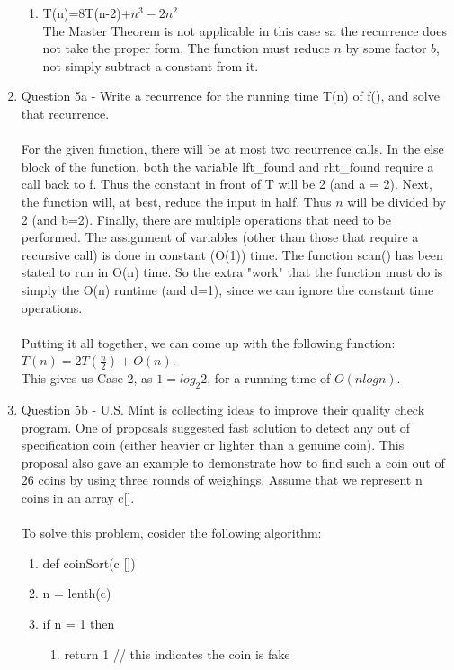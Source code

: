 \documentclass{article}
\begin{document}
\begin{enumerate}
\begin{enumerate}
        \item T(n)=8T(n-2)+\(n^3-2n^2\)\\
        The Master Theorem is not applicable in this case sa the recurrence does not take the proper form.
        The function must reduce $n$ by some factor $b$, not simply subtract a constant from it.\\

    \end{enumerate}
  \item Question 5a - Write a recurrence for the running time T(n) of f(), and solve that recurrence.\\\\
    For the given function, there will be at most two recurrence calls. In the else block of the function, 
    both the variable lft\_found and rht\_found require a call back to f. Thus the constant in front of T will be 2 (and
    a = 2). Next, the function will, at best, reduce the input in half. Thus $n$ will be divided by 2 (and b=2).
    Finally, there are multiple operations that need to be performed. The assignment of variables (other than those that
    require a recursive call) is done in constant (O(1)) time. The function scan() has been stated to run in O(n) time.
    So the extra "work" that the function must do is simply the O(n) runtime (and d=1), since we can ignore the constant time
    operations. \\\\
    Putting it all together, we can come up with the following function: $T(n) = 2T(\frac n 2) + O(n)$.\\
    This gives us Case 2, as $1=log_{2}2$, for a running time of $O(n log n)$.
    

    \item Question 5b - U.S. Mint is collecting ideas to improve their quality check program. One of proposals 
      suggested fast solution to detect any out of specification coin (either heavier or lighter than a genuine coin).
      This proposal also gave an example to demonstrate how to find such a coin out of 26 coins by using three 
      rounds of weighings. Assume that we represent n coins in an array c[].\\\\

      To solve this problem, cosider the following algorithm:\\
      
    \begin{enumerate}[\indent {}]
      \item def coinSort(c [])
      \item n = lenth(c)
      \item if n = 1 then
    \begin{enumerate}[\indent {}]
      \item return 1 // this indicates the coin is fake
    \end{enumerate}


\end{enumerate}
\end{enumerate}
\end{document}
